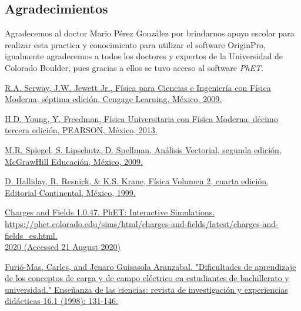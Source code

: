 \documentclass[a4paper,10pt]{article}
\begin{document}
\begin{multicols}{2}
\section{\textcolor{MiColor1}{\textbf{Agradecimientos}}}
Agradecemos al doctor Mario Pérez González por brindarnos apoyo escolar para realizar esta practica y conocimiento para utilizar el software OriginPro, igualmente agradecemos a todos los doctores y expertos de la Universidad de Colorado Boulder, pues gracias a ellos se tuvo acceso al software \textit{PhET}.
\begin{thebibliography}{0}
\textcolor{MiColor2}{\protect\href{http://www.labvirfis.com/textos/serway1.pdf}{ R.A. Serway, J.W. Jewett Jr., Física para Ciencias e Ingeniería con Física Moderna, séptima edición, Cengage Learning, México, 2009.}} \par
{}\textcolor{MiColor2}{\protect\href{https://www.u-cursos.cl/usuario/42103e5ee2ce7442a3921d69b0200c93/mi_blog/r/Fisica_General_-_Fisica_Universitaria_Vol_2__ed_12\%28Sears-Zemansky\%29.pdf}{H.D. Young, Y. Freedman, Física Universitaria con Física Moderna, décimo tercera edición, PEARSON, México, 2013.}} \par
{}\textcolor{MiColor2}{\protect\href{http://www.irya.unam.mx/~g.bruzual/Mecanica_Clasica/Analisis\%20Vectorial\%20-\%20R.\%20Spiegel,\%20S.\%20Lipschutz.pdf}{M.R. Spiegel, S. Lipschutz, D. Spellman, Análisis Vectorial, segunda edición, McGrawHill Educación, México, 2009.}} \par
{}\textcolor{MiColor2}{\protect\href{http://www.fulviofrisone.com/attachments/article/485/Resnick-Fisica\%20Vol\%202.pdf}{D. Halliday, R. Resnick, \& K.S. Krane, Física Volumen 2, cuarta edición, Editorial Continental, México, 1999.}} \par
{}\textcolor{MiColor2}{\protect\href{https://phet.colorado.edu/sims/html/charges-and-fields/latest/charges-and-fields_es.html}{Charges and Fields 1.0.47. PhET: Interactive Simulations. \\ https://phet.colorado.edu/sims/html/charges-and-fields/latest/charges-and-fields\_es.html. \\ 2020 (Accessed 21 August 2020)}} \par
{}\textcolor{MiColor2}{\protect\href{https://www.raco.cat/index.php/Ensenanza/article/view/83239/108222}{Furió-Mas, Carles, and Jenaro Guisasola Aranzabal. "Dificultades de aprendizaje de los conceptos de carga y de campo eléctrico en estudiantes de bachillerato y universidad." Enseñanza de las ciencias: revista de investigación y experiencias didácticas 16.1 (1998): 131-146.}} \par

\end{thebibliography}
\end{multicols}
\end{document}
